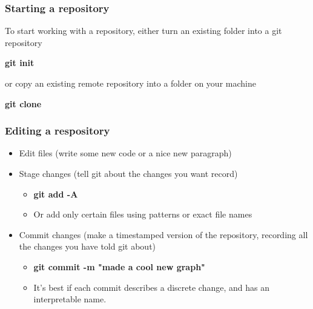 \documentclass{beamer}
\newcommand{\code}[1]{{\fontfamily{pcr}\selectfont \textbf{#1}}}
\begin{document}


\begin{frame}
\frametitle{Starting a repository}

To start working with a repository, either turn an existing folder into a git repository

\medskip

\code{git init}

\medskip

or copy an existing remote repository into a folder on your machine

\medskip

\code{git clone}

\end{frame}

\begin{frame}
	\frametitle{Editing a respository}
	
	\begin{itemize}
		\item<1-> Edit files (write some new code or a nice new paragraph)
		
\par\noindent\hrulefill\par
		
		\item<2-> Stage changes (tell git about the changes you want record)
		
		\begin{itemize}
			\item \code{git add -A}
			\item Or add only certain files using patterns or exact file names
		\end{itemize}
		
		\par\noindent\hrulefill\par
		
		\item<3-> Commit changes (make a timestamped version of the repository, recording all the changes you have told git about)
		\begin{itemize}
			\item \code{git commit -m "made a cool new graph"}
			\item It's best if each commit describes a discrete change, and has an interpretable name.
		\end{itemize}
		
		\par\noindent\hrulefill\par
	\end{itemize}
	
	
\end{frame}
\end{document}
